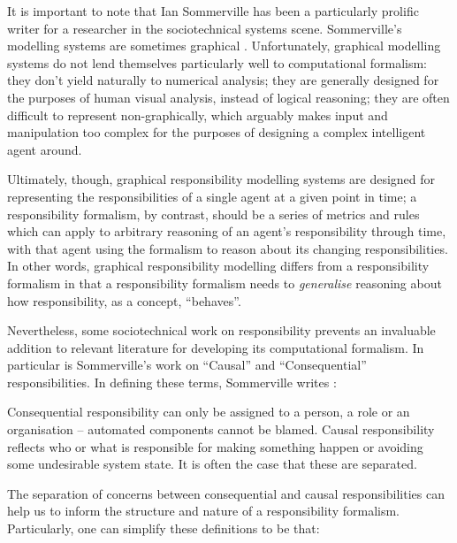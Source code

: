 It is important to note that Ian Sommerville has been a particularly prolific writer for a researcher in the sociotechnical systems scene. Sommerville's modelling systems are sometimes graphical \parencite{sommerville_graphical_responsibility}. Unfortunately, graphical modelling systems do not lend themselves particularly well to computational formalism: they don't yield naturally to numerical analysis; they are generally designed for the purposes of human visual analysis, instead of logical reasoning; they are often difficult to represent non-graphically, which arguably makes input and manipulation too complex for the purposes of designing a complex intelligent agent around.\par

Ultimately, though, graphical responsibility modelling systems are designed for representing the responsibilities of a single agent at a given point in time; a responsibility formalism, by contrast, should be a series of metrics and rules which can apply to arbitrary reasoning of an agent's responsibility through time, with that agent using the formalism to reason about its changing responsibilities. In other words, graphical responsibility modelling differs from a responsibility formalism in that a responsibility formalism needs to \emph{generalise} reasoning about how responsibility, as a concept, ``behaves''.\par

Nevertheless, some sociotechnical work on responsibility prevents an invaluable addition to relevant literature for developing its computational formalism. In particular is Sommerville's work on ``Causal'' and ``Consequential'' responsibilities. In defining these terms, Sommerville writes \parencite{sommerville_dependable_systems_chap_8}:

\begin{displayquote}
    Consequential responsibility can only be assigned to a person, a role or an organisation – automated components cannot be blamed. Causal responsibility reflects who or what is responsible for making something happen or avoiding some undesirable system state. It is often the case that these are separated.
\end{displayquote}

The separation of concerns between consequential and causal responsibilities can help us to inform the structure and nature of a responsibility formalism. Particularly, one can simplify these definitions to be that:

